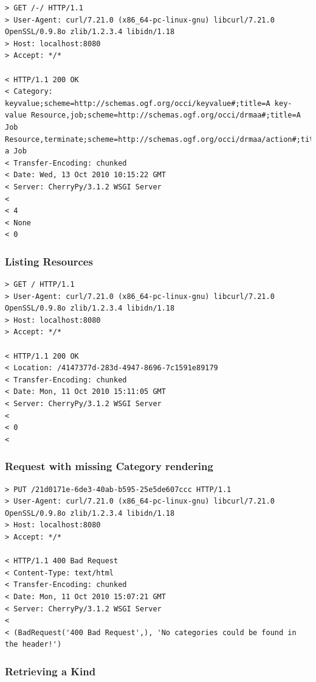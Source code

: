 \documentclass[10pt,a4paper]{article}
\begin{document}
\begin{verbatim}
> GET /-/ HTTP/1.1
> User-Agent: curl/7.21.0 (x86_64-pc-linux-gnu) libcurl/7.21.0 OpenSSL/0.9.8o zlib/1.2.3.4 libidn/1.18
> Host: localhost:8080
> Accept: */*

< HTTP/1.1 200 OK
< Category: keyvalue;scheme=http://schemas.ogf.org/occi/keyvalue#;title=A key-value Resource,job;scheme=http://schemas.ogf.org/occi/drmaa#;title=A Job Resource,terminate;scheme=http://schemas.ogf.org/occi/drmaa/action#;title=Terminate a Job
< Transfer-Encoding: chunked
< Date: Wed, 13 Oct 2010 10:15:22 GMT
< Server: CherryPy/3.1.2 WSGI Server
< 
< 4
< None
< 0
\end{verbatim}

\subsubsection{Listing Resources}

\begin{verbatim}
> GET / HTTP/1.1
> User-Agent: curl/7.21.0 (x86_64-pc-linux-gnu) libcurl/7.21.0 OpenSSL/0.9.8o zlib/1.2.3.4 libidn/1.18
> Host: localhost:8080
> Accept: */*

< HTTP/1.1 200 OK
< Location: /4147377d-283d-4947-8696-7c1591e89179
< Transfer-Encoding: chunked
< Date: Mon, 11 Oct 2010 15:11:05 GMT
< Server: CherryPy/3.1.2 WSGI Server
<
< 0
<
\end{verbatim}

\subsubsection{Request with missing Category rendering}

\begin{verbatim}
> PUT /21d0171e-6de3-40ab-b595-25e5de607ccc HTTP/1.1
> User-Agent: curl/7.21.0 (x86_64-pc-linux-gnu) libcurl/7.21.0 OpenSSL/0.9.8o zlib/1.2.3.4 libidn/1.18
> Host: localhost:8080
> Accept: */*

< HTTP/1.1 400 Bad Request
< Content-Type: text/html
< Transfer-Encoding: chunked
< Date: Mon, 11 Oct 2010 15:07:21 GMT
< Server: CherryPy/3.1.2 WSGI Server
< 
< (BadRequest('400 Bad Request',), 'No categories could be found in the header!')
\end{verbatim}

\subsubsection{Retrieving a Kind}
\end{document}
